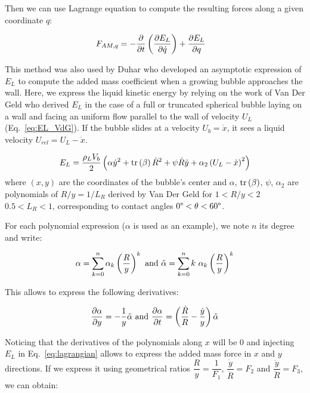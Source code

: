 Then we can use Lagrange equation to compute the resulting forces along a given coordinate $q$:


\begin{align}
F_{AM,q}&=-\frac{\partial }{\partial t}\left( \frac{\partial E_{L}}{\partial \dot{q}} \right)+\frac{\partial E_{L}}{\partial q}
\label{eq:lagrangian}
\end{align}


This method was also used by Duhar \cite{duhar_dynamics_2006} who developed an asymptotic expression of $E_{L}$ to compute the added mass coefficient when a growing bubble approaches the wall. Here, we express the liquid kinetic energy by relying on the work of Van Der Geld \cite{van_der_geld_dynamics_2009} who derived $E_{L}$ in the case of a full or truncated spherical bubble laying on a wall and facing an uniform flow parallel to the wall of velocity $U_{L}$ (Eq.~\ref{eq:EL_VdG}). If the bubble slides at a velocity $U_{b}=\dot{x}$, it sees a liquid velocity $U_{rel}=U_{L}-\dot{x}$.

\begin{align}
E_{L}=\frac{\rho_{L}V_{b}}{2}\left( \alpha \dot{y}^{2} +\mathrm{tr}\left( \beta \right)\dot{R}^{2}+\psi \dot{R}\dot{y} +\alpha_{2} \left( U_{L}-\dot{x} \right)^{2}  \right)
\label{eq:EL_VdG}
\end{align}
where $(x,y)$ are the coordinates of the bubble's center and $\alpha$, $\mathrm{tr}\left( \beta \right)$, $\psi$, $\alpha_{2}$ are polynomials of $R/y = 1/L_{R}$ derived by Van Der Geld for $1<R/y<2$ \ie $0.5<L_{R}<1$, corresponding to contact angles $0\degree < \theta < 60\degree$.

\npar
For each polynomial expression ($\alpha$ is used as an example), we note $n$ its degree and write:

\begin{equation}
\alpha = \sum_{k=0}^{n}\alpha_{k}\parth{\frac{R}{y} }^{k}\ \text{and}\ \tilde{\alpha}= \sum_{k=0}^{n}k\ \alpha_{k}\parth{\frac{R}{y} }^{k}
\end{equation}

This allows to express the following derivatives:

\begin{equation}
\frac{\partial \alpha}{\partial y} = -\frac{1}{y} \tilde{\alpha}\ \text{and}\ \frac{\partial \alpha}{\partial t} = \left( \frac{\dot{R}}{R} - \frac{\dot{y}}{y} \right) \tilde{\alpha}
\end{equation}


Noticing that the derivatives of the polynomials along $x$ will be 0 and injecting $E_{L}$ in Eq.~\ref{eq:lagrangian} allows to express the added mass force in $x$ and $y$ directions. If we express it using geometrical ratios $\dfrac{R}{y}=\dfrac{1}{F_{1}}$, $\dfrac{\dot{y}}{\dot{R}}=F_{2}$ and $\dfrac{\ddot{y}}{\ddot{R}}=F_{3}$, we can obtain:


